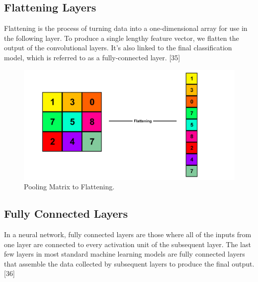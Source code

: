 \vspace{5mm}
\subsection{Flattening Layers}

\vspace{5mm}
Flattening is the process of turning data into a one-dimensional array for use in the following layer. To produce a single lengthy feature vector, we flatten the output of the convolutional layers. It's also linked to the final classification model, which is referred to as a fully-connected layer. [35]

\vspace{5mm}
\begin{figure}[hbt!]
\centering
\includegraphics[scale=0.5]{images/Pooling Matrix to Flattening..png}
\caption{Pooling Matrix to Flattening.}
\label{fig:x Pooling Matrix to Flattening}
\end{figure}

\vspace{5mm}
\subsection{Fully Connected Layers}

\vspace{5mm}
In a neural network, fully connected layers are those where all of the inputs from one layer are connected to every activation unit of the subsequent layer. The last few layers in most standard machine learning models are fully connected layers that assemble the data collected by subsequent layers to produce the final output.[36]

